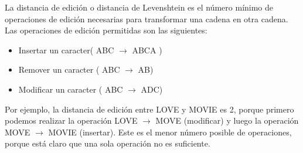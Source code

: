 La distancia de edición o distancia de Levenshtein es el número mínimo de operaciones de edición necesarias para transformar una cadena en otra cadena. Las operaciones de edición permitidas son las siguientes:

\begin{itemize}
	\item Insertar un caracter( ABC $\rightarrow$ ABCA )
	\item Remover un caracter ( ABC $\rightarrow$ AB)
	\item Modificar un caracter ( ABC $\rightarrow$ ADC)
\end{itemize}

Por ejemplo, la distancia de edición entre LOVE y MOVIE es 2, porque primero podemos realizar la operación LOVE $\rightarrow$ MOVE (modificar) y luego la operación MOVE $\rightarrow$ MOVIE (insertar). Este es el menor número posible de operaciones, porque está claro que una sola operación no es suficiente.